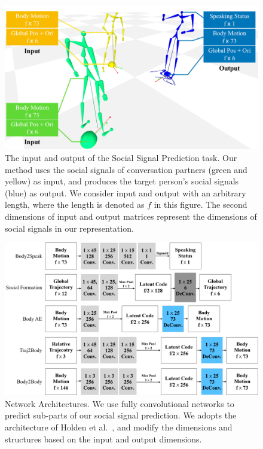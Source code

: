 \begin{figure}[t]		
	\includegraphics[width=\linewidth]{ssp_fig/Input_output.pdf}
	\caption{The input and output of the Social Signal Prediction task. Our method uses the social signals of conversation partners (green and yellow) as input, and produces the target person's social signals (blue) as output. We consider input and output with an arbitrary length, where the length is denoted as $f$ in this figure. The second dimensions of input and output matrices represent the dimensions of social signals in our representation.}
	\label{fig:inputOutput}
\end{figure}

\begin{figure}[t]	
	\includegraphics[width=\textwidth]{ssp_fig/networks}
	\caption{Network Architectures. We use fully convolutional networks to predict sub-parts of our social signal prediction. We adopts the architecture of Holden et al.~\cite{holden2016deep}, and modify the dimensions and structures based on the input and output dimensions. }
	\label{fig:architectures}
\end{figure}



